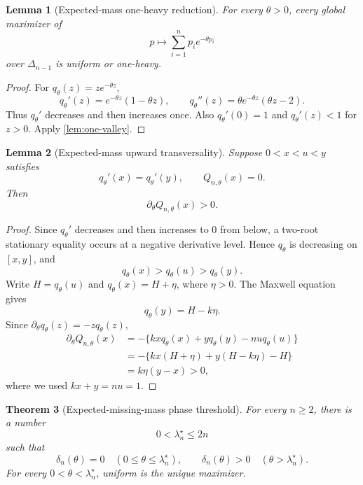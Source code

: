 \documentclass[11pt]{article}
\theoremstyle{plain}
\newtheorem{theorem}{Theorem}[section]
\newtheorem{lemma}[theorem]{Lemma}
\theoremstyle{definition}
\theoremstyle{remark}
\newcommand{\simplex}{\Delta_{n-1}}
\begin{document}
\begin{lemma}[Expected-mass one-heavy reduction]\label{lem:expected-one-heavy}
For every \(\theta>0\), every global maximizer of
\[
p\longmapsto \sum_{i=1}^n p_i e^{-\theta p_i}
\]
over \(\simplex\) is uniform or one-heavy.
\end{lemma}

\begin{proof}
For \(q_\theta(z)=ze^{-\theta z}\),
\[
q_\theta'(z)=e^{-\theta z}(1-\theta z),\qquad
q_\theta''(z)=\theta e^{-\theta z}(\theta z-2).
\]
Thus \(q_\theta'\) decreases and then increases once.  Also \(q_\theta'(0)=1\) and \(q_\theta'(z)<1\) for \(z>0\).  Apply \cref{lem:one-valley}.
\end{proof}

\begin{lemma}[Expected-mass upward transversality]\label{lem:expected-transversality}
Suppose \(0<x<u<y\) satisfies
\[
q_\theta'(x)=q_\theta'(y),\qquad
Q_{n,\theta}(x)=0.
\]
Then
\[
\partial_\theta Q_{n,\theta}(x)>0.
\]
\end{lemma}

\begin{proof}
Since \(q_\theta'\) decreases and then increases to \(0\) from below, a two-root stationary equality occurs at a negative derivative level.  Hence \(q_\theta\) is decreasing on \([x,y]\), and
\[
q_\theta(x)>q_\theta(u)>q_\theta(y).
\]
Write \(H=q_\theta(u)\) and \(q_\theta(x)=H+\eta\), where \(\eta>0\).  The Maxwell equation gives
\[
q_\theta(y)=H-k\eta.
\]
Since \(\partial_\theta q_\theta(z)=-zq_\theta(z)\),
\begin{align*}
\partial_\theta Q_{n,\theta}(x)
&=-\{kxq_\theta(x)+yq_\theta(y)-nuq_\theta(u)\}\\
&=-\{kx(H+\eta)+y(H-k\eta)-H\}\\
&=k\eta(y-x)>0,
\end{align*}
where we used \(kx+y=nu=1\).
\end{proof}

\begin{theorem}[Expected-missing-mass phase threshold]\label{thm:expected-threshold}
For every \(n\ge2\), there is a number
\[
0<\lambda_n^\star\le2n
\]
such that
\[
\delta_n(\theta)=0\quad(0\le\theta\le\lambda_n^\star),
\qquad
\delta_n(\theta)>0\quad(\theta>\lambda_n^\star).
\]
For every \(0<\theta<\lambda_n^\star\), uniform is the unique maximizer.
\end{theorem}
\end{document}
